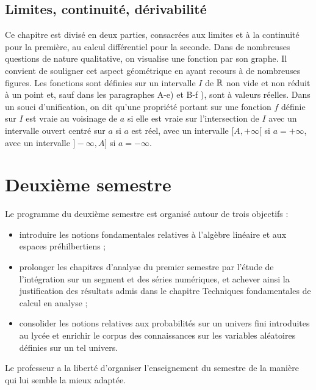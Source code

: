 \setcounter{subsubsection}{0}






\subsection{Limites, continuité, dérivabilité}
\begin{itshape}
Ce chapitre est divisé en deux parties, consacrées aux limites et à la continuité pour la première, au calcul différentiel
pour la seconde.\newline
Dans de nombreuses questions de nature qualitative, on visualise une fonction par son graphe. Il convient de souligner
cet aspect géométrique en ayant recours à de nombreuses figures.\newline
Les fonctions sont définies sur un intervalle $I$ de $\mathbb{R}$ non vide et non réduit à un point et, sauf dans les paragraphes A-e) et B-f ), sont à valeurs réelles.\newline
Dans un souci d’unification, on dit qu’une propriété portant sur une fonction $f$ définie sur $I$ est vraie au voisinage de $a$ si elle est vraie sur l’intersection de $I$ avec un intervalle ouvert centré sur $a$ si $a$ est réel, avec un intervalle $[A, +\infty[$ si $a=+\infty$, avec un intervalle $]-\infty, A]$ si $a =-\infty$.
\end{itshape}








\section{Deuxième semestre}
Le programme du deuxième semestre est organisé autour de trois objectifs :
\begin{itemize}
 \item  introduire les notions fondamentales relatives à l’algèbre linéaire et aux espaces préhilbertiens ;
 \item  prolonger les chapitres d’analyse du premier semestre par l’étude de l’intégration sur un segment et des séries
   numériques, et achever ainsi la justification des résultats admis dans le chapitre \og Techniques fondamentales de
   calcul en analyse \fg ;
 \item consolider les notions relatives aux probabilités sur un univers fini introduites au lycée et enrichir le corpus des
   connaissances sur les variables aléatoires définies sur un tel univers.
\end{itemize}
Le professeur a la liberté d’organiser l’enseignement du semestre de la manière qui lui semble la mieux adaptée.

